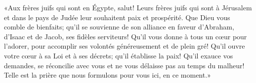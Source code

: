 «Aux frères juifs qui sont en Égypte, salut!
	Leurs frères juifs qui sont à Jérusalem et dans le pays de Judée
		leur souhaitent paix et prospérité.
Que Dieu vous comble de bienfaits;
	qu’il se souvienne de son alliance en faveur d’Abraham, d’Isaac et de Jacob,
	ses fidèles serviteurs!
Qu’il vous donne à tous un cœur pour l’adorer,
	pour accomplir ses volontés généreusement et de plein gré!
Qu’il ouvre votre cœur à sa Loi et à ses décrets;
	qu’il établisse la paix!
Qu’il exauce vos demandes, se réconcilie avec vous
	et ne vous délaisse pas au temps du malheur!
Telle est la prière que nous formulons pour vous ici, en ce moment.»
